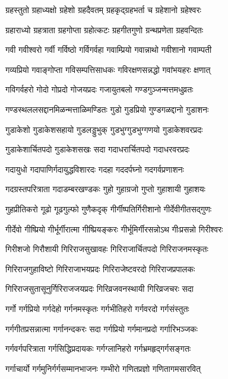 \twolineshloka
{ग्रहस्तुतो ग्रहाध्यक्षो ग्रहेशो ग्रहदैवतम्}%
{ग्रहकृद्ग्रहभर्ता च ग्रहेशानो ग्रहेश्वरः}%

\twolineshloka
{ग्रहाराध्यो ग्रहत्राता ग्रहगोप्ता ग्रहोत्कटः}%
{ग्रहगीतगुणो ग्रन्थप्रणेता ग्रहवन्दितः}%

\twolineshloka
{गवी गवीश्वरो गर्वी गर्विष्ठो गर्विगर्वहा}%
{गवाम्प्रियो गवान्नाथो गवीशानो गवाम्पती}%

\twolineshloka
{गव्यप्रियो गवाङ्गोप्ता गविसम्पत्तिसाधकः}%
{गविरक्षणसन्नद्धो गवांभयहरः क्षणात्}%

\twolineshloka
{गविगर्वहरो गोदो गोप्रदो गोजयप्रदः}%
{गजायुतबलो गण्डगुञ्जन्मत्तमधुव्रतः}%

\twolineshloka
{गण्डस्थललसद्दानमिळन्मत्ताळिमण्डितः}%
{गुडो गुडप्रियो गुण्डगळद्दानो गुडाशनः}%

\twolineshloka
{गुडाकेशो गुडाकेशसहायो गुडलड्डुभुक्}%
{गुडभुग्गुडभुग्गणयो गुडाकेशवरप्रदः}%

\twolineshloka
{गुडाकेशार्चितपदो गुडाकेशसखः सदा}%
{गदाधरार्चितपदो गदाधरवरप्रदः}%

\twolineshloka
{गदायुधो गदापाणिर्गदायुद्धविशारदः}%
{गदहा गददर्पघ्नो गदगर्वप्रणाशनः}%

\twolineshloka
{गदग्रस्तपरित्राता गदाडम्बरखण्डकः}%
{गुहो गुहाग्रजो गुप्तो गुहाशायी गुहाशयः}%

\twolineshloka
{गुहप्रीतिकरो गूढो गूढगुल्फो गुणैकदृक्}%
{गीर्गीष्पतिर्गिरीशानो गीर्देवीगीतसद्गुणः}%

\twolineshloka
{गीर्देवो गीष्प्रियो गीर्भूर्गीरात्मा गीष्प्रियङ्करः}%
{गीर्भूमिर्गीरसन्नोऽथ गीःप्रसन्नो गिरीश्वरः}%

\twolineshloka
{गिरीशजो गिरौशायी गिरिराजसुखावहः}%
{गिरिराजार्चितपदो गिरिराजनमस्कृतः}%

\twolineshloka
{गिरिराजगुहाविष्टो गिरिराजाभयप्रदः}%
{गिरिराजेष्टवरदो गिरिराजप्रपालकः}%

\twolineshloka
{गिरिराजसुतासूनुर्गिरिराजजयप्रदः}%
{गिरिव्रजवनस्थायी गिरिव्रजचरः सदा}%

\twolineshloka
{गर्गो गर्गप्रियो गर्गदेहो गर्गनमस्कृतः}%
{गर्गभीतिहरो गर्गवरदो गर्गसंस्तुतः}%

\twolineshloka
{गर्गगीतप्रसन्नात्मा गर्गानन्दकरः सदा}%
{गर्गप्रियो गर्गमानप्रदो गर्गारिभञ्जकः}%

\twolineshloka
{गर्गवर्गपरित्राता गर्गसिद्धिप्रदायकः}%
{गर्गग्लानिहरो गर्गभ्रमहृद्गर्गसङ्गतः}%

\twolineshloka
{गर्गाचार्यो गर्गमुनिर्गर्गसम्मानभाजनः}%
{गम्भीरो गणितप्रज्ञो गणितागमसारवित्}%

